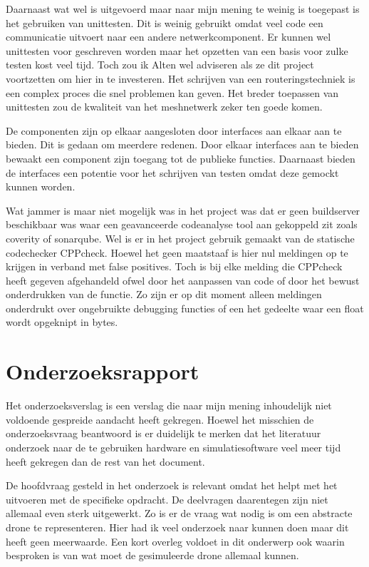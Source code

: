 \documentclass[a4paper, 11pt, oneside]{report}
\begin{document}
Daarnaast wat wel is uitgevoerd maar naar mijn mening te weinig is toegepast is het gebruiken van unittesten.
Dit is weinig gebruikt omdat veel code een communicatie uitvoert naar een andere netwerkcomponent.
Er kunnen wel unittesten voor geschreven worden maar het opzetten van een basis voor zulke testen kost veel tijd.
Toch zou ik Alten wel adviseren als ze dit project voortzetten om hier in te investeren.
Het schrijven van een routeringstechniek is een complex proces die snel problemen kan geven.
Het breder toepassen van unittesten zou de kwaliteit van het meshnetwerk zeker ten goede komen. 

De componenten zijn op elkaar aangesloten door interfaces aan elkaar aan te bieden.
Dit is gedaan om meerdere redenen. 
Door elkaar interfaces aan te bieden bewaakt een component zijn toegang tot de publieke functies.
Daarnaast bieden de interfaces een potentie voor het schrijven van testen omdat deze gemockt kunnen worden.  

Wat jammer is maar niet mogelijk was in het project was dat er geen buildserver beschikbaar was waar een geavanceerde codeanalyse tool aan gekoppeld zit zoals coverity of sonarqube. Wel is er in het project gebruik gemaakt van de statische codechecker CPPcheck. Hoewel het geen maatstaaf is hier nul meldingen op te krijgen in verband met false positives. 
Toch is bij elke melding die CPPcheck heeft gegeven afgehandeld ofwel door het aanpassen van code of door het bewust onderdrukken van de functie. Zo zijn er op dit moment alleen meldingen onderdrukt over ongebruikte debugging functies of een het gedeelte waar een float wordt opgeknipt in bytes.
  
\section{Onderzoeksrapport}\label{sec:onderzoeksrapport}

Het onderzoeksverslag is een verslag die naar mijn mening inhoudelijk niet voldoende gespreide aandacht heeft gekregen. Hoewel het misschien de onderzoeksvraag beantwoord is er duidelijk te merken dat het literatuur onderzoek naar de te gebruiken hardware en simulatiesoftware veel meer tijd heeft gekregen dan de rest van het document.

De hoofdvraag gesteld in het onderzoek is relevant omdat het helpt met het uitvoeren met de specifieke opdracht.
De deelvragen daarentegen zijn niet allemaal even sterk uitgewerkt. 
Zo is er de vraag wat nodig is om een abstracte drone te representeren. 
Hier had ik veel onderzoek naar kunnen doen maar dit heeft geen meerwaarde. 
Een kort overleg voldoet in dit onderwerp ook waarin besproken is van wat moet de gesimuleerde drone allemaal kunnen.
\end{document}
